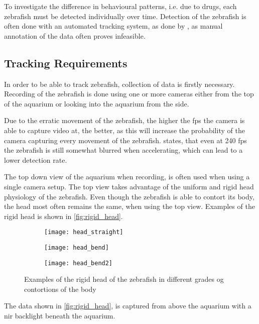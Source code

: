 To investigate the difference in behavioural patterns, i.e. due to drugs, each zebrafish must be detected individually over time. Detection of the zebrafish is often done with an automated tracking system, as done by \cite{Stewart2015}, as manual annotation of the data often proves infeasible.

\subsection{Tracking Requirements}
In order to be able to track zebrafish, collection of data is firstly necessary. Recording of the zebrafish is done using one or more cameras either from the top of the aquarium or looking into the aquarium from the side.

Due to the erratic movement of the zebrafish, the higher the \gls{fps} the camera is able to capture video at, the better, as this will increase the probability of the camera capturing every movement of the zebrafish. \cite{Pedersen2017} states, that even at 240 \gls{fps} the zebrafish is still somewhat blurred when accelerating, which can lead to a lower detection rate.

The top down view of the aquarium when recording, is often used when using a single camera setup. The top view takes advantage of the uniform and rigid head physiology of the zebrafish. Even though the zebrafish is able to contort its body, the head most often remains the same, when using the top view. Examples of the rigid head is shown in \autoref{fig:rigid_head}.

\begin{figure}[H]
	\centering
	\begin{subfigure}[b]{0.3\textwidth}
		\texttt{[image: head\_straight]}
		\label{fig:head_straight}
	\end{subfigure}
	\begin{subfigure}[b]{0.3\textwidth}
		\texttt{[image: head\_bend]}
		\label{fig:head_bend}
	\end{subfigure}
	\begin{subfigure}[b]{0.3\textwidth}
		\texttt{[image: head\_bend2]}
		\label{fig:head_bend2}
	\end{subfigure}
	\caption{Examples of the rigid head of the zebrafish in different grades og contortions of the body}
	\label{fig:rigid_head}
\end{figure}

The data shown in \autoref{fig:rigid_head}, is captured from above the aquarium with a \gls{nir} backlight beneath the aquarium.\\

